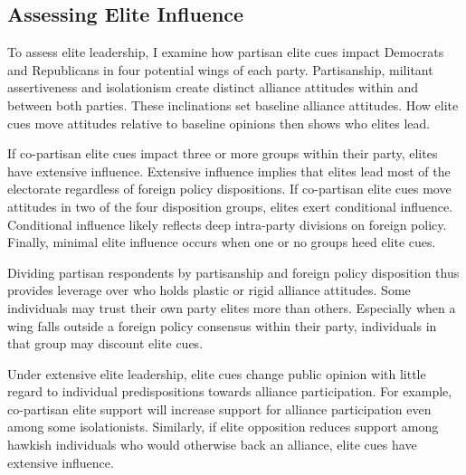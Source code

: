 \documentclass[12pt]{article}
\begin{document}



\subsection{Assessing Elite Influence}


To assess elite leadership, I examine how partisan elite cues impact Democrats and Republicans in four potential wings of each party.
Partisanship, militant assertiveness and isolationism create distinct alliance attitudes within and between both parties. 
These inclinations set baseline alliance attitudes. 
How elite cues move attitudes relative to baseline opinions then shows who elites lead. 


If co-partisan elite cues impact three or more groups within their party, elites have extensive influence. 
Extensive influence implies that elites lead most of the electorate regardless of foreign policy dispositions. 
If co-partisan elite cues move attitudes in two of the four disposition groups, elites exert conditional influence. 
Conditional influence likely reflects deep intra-party divisions on foreign policy. 
Finally, minimal elite influence occurs when one or no groups heed elite cues.


Dividing partisan respondents by partisanship and foreign policy disposition thus provides leverage over who holds plastic or rigid alliance attitudes. 
Some individuals may trust their own party elites more than others. 
Especially when a wing falls outside a foreign policy consensus within their party, individuals in that group may discount elite cues.


Under extensive elite leadership, elite cues change public opinion with little regard to individual predispositions towards alliance participation. 
For example, co-partisan elite support will increase support for alliance participation even among some isolationists. 
Similarly, if elite opposition reduces support among hawkish individuals who would otherwise back an alliance, elite cues have extensive influence. 
\end{document}
